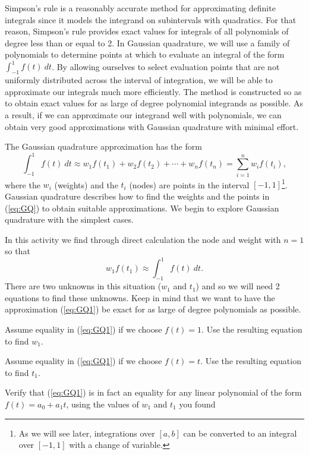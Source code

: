 \ee

\label{sec:proj_gaussian_quad}

Simpson's rule is a reasonably accurate method for approximating definite integrals since it  models the integrand on subintervals with quadratics. For that reason, Simpson's rule provides exact values for integrals of all polynomials of degree less than or equal to 2. In Gaussian quadrature, we will use a family of polynomials to determine points at which to evaluate an integral of the form $\int_{-1}^1 f(t) \ dt$. By allowing ourselves to select evaluation points that are not uniformly distributed across the interval of integration, we will be able to approximate our integrals much more efficiently. The method is constructed so as to obtain exact values for as large of degree polynomial integrands as possible. As a result, if we can approximate our integrand well with polynomials, we can obtain very good approximations with Gaussian quadrature with minimal effort.

The Gaussian quadrature approximation has the form
\begin{equation}
\int_{-1}^1 f(t) \ dt \approx w_1f(t_1) + w_2 f(t_2) + \cdots + w_n f(t_n) = \sum_{i=1}^n w_if(t_i), \label{eq:GQ}
\end{equation}
where the $w_i$ (weights) and the $t_i$ (nodes) are points in the interval $[-1,1]$\footnote{As we will see later, integrations over $[a,b]$ can be converted to an integral over $[-1,1]$ with a change of variable.}. Gaussian quadrature describes how to find the weights and the points in (\ref{eq:GQ}) to obtain suitable approximations. We begin to explore Gaussian quadrature with the simplest cases.

\begin{pactivity} \label{act:GQ_1} In this activity we find through direct calculation the node and weight with $n=1$ so that
\begin{equation}
w_1f(t_1) \approx \int_{-1}^1 f(t) \ dt. \label{eq:GQ1}
\end{equation}
There are two unknowns in this situation ($w_1$ and $t_1$) and so we will need 2 equations to find these unknowns. Keep in mind that we want to have the approximation (\ref{eq:GQ1}) be exact for as large of degree polynomials as possible.
	\ba
	\item Assume equality in (\ref{eq:GQ1}) if we choose $f(t) = 1$. Use the resulting equation to find $w_1$.
	

	\item Assume equality in (\ref{eq:GQ1}) if we choose $f(t) = t$. Use the resulting equation to find $t_1$.

	
	\item Verify that (\ref{eq:GQ1}) is in fact an equality for any linear polynomial of the form $f(t) = a_0+a_1t$, using the values of $w_1$ and $t_1$ you found
	
	\ea
\end{pactivity}

